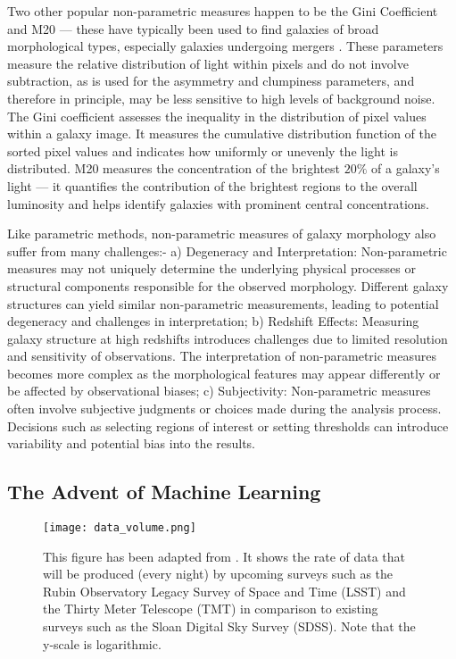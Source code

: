 Two other popular non-parametric measures happen to be the Gini Coefficient and M20 --- these have typically been used to find galaxies of broad morphological types, especially galaxies undergoing mergers \citep{abraham_03, lotz_04}. These parameters measure the relative distribution of light within pixels and do not involve subtraction, as is used for the asymmetry and clumpiness parameters, and therefore in principle, may be less sensitive to high levels of background noise. The Gini coefficient assesses the inequality in the distribution of pixel values within a galaxy image. It measures the cumulative distribution function of the sorted pixel values and indicates how uniformly or unevenly the light is distributed. M20 measures the concentration of the brightest $20\%$ of a galaxy's light --- it quantifies the contribution of the brightest regions to the overall luminosity and helps identify galaxies with prominent central concentrations.

Like parametric methods, non-parametric measures of galaxy morphology also suffer from many challenges:- a) Degeneracy and Interpretation: Non-parametric measures may not uniquely determine the underlying physical processes or structural components responsible for the observed morphology. Different galaxy structures can yield similar non-parametric measurements, leading to potential degeneracy and challenges in interpretation; b) Redshift Effects: Measuring galaxy structure at high redshifts introduces challenges due to limited resolution and sensitivity of observations. The interpretation of non-parametric measures becomes more complex as the morphological features may appear differently or be affected by observational biases; c) Subjectivity:  Non-parametric measures often involve subjective judgments or choices made during the analysis process. Decisions such as selecting regions of interest or setting thresholds can introduce variability and potential bias into the results.

\subsection{The Advent of Machine Learning} \label{sec_intro:ml_morph}

\begin{figure}[htbp]
    \centering
    \texttt{[image: data\_volume.png]}
    \caption{This figure has been adapted from \citet{kremer_17}. It shows the rate of data that will be produced (every night) by upcoming surveys such as the Rubin Observatory Legacy Survey of Space and Time (LSST) and the Thirty Meter Telescope (TMT) in comparison to existing surveys such as the Sloan Digital Sky Survey (SDSS). Note that the y-scale is logarithmic.}
    \label{fig_intro:data_volume}
\end{figure}


